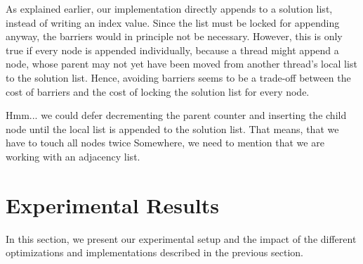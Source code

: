 \documentclass[letterpaper]{article}
\begin{document}
As explained earlier, our implementation directly appends to a solution list, instead of writing an index value.
Since the list must be locked for appending anyway, the barriers would in principle not be necessary.
However, this is only true if every node is appended individually, because a thread might append a node, whose parent may not yet have been moved from another thread's local list to the solution list.
Hence, avoiding barriers seems to be a trade-off between the cost of barriers and the cost of locking the solution list for every node.

\begin{invisible}
Hmm... we could defer decrementing the parent counter and inserting the child node until the local list is appended to the solution list. That means, that we have to touch all nodes twice
Somewhere, we need to mention that we are working with an adjacency list.
\end{invisible}

\section{Experimental Results}\label{sec:exp}
In this section, we present our experimental setup and the impact of the different optimizations and implementations described in the previous section.
\end{document}
